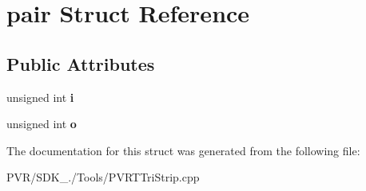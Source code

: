\hypertarget{structpair}{\section{pair Struct Reference}
\label{structpair}
}
\subsection*{Public Attributes}
\begin{DoxyCompactItemize}
\item 
\hypertarget{structpair_aa0a2b4b7917534d8cc0e88d2f950b530}{unsigned int {\bfseries i}}\label{structpair_aa0a2b4b7917534d8cc0e88d2f950b530}

\item 
\hypertarget{structpair_a8e54eebfa8fa9f8f449626524deb8d28}{unsigned int {\bfseries o}}\label{structpair_a8e54eebfa8fa9f8f449626524deb8d28}

\end{DoxyCompactItemize}


The documentation for this struct was generated from the following file\+:\begin{DoxyCompactItemize}
\item 
P\+V\+R/\+S\+D\+K\+\_./\+Tools/P\+V\+R\+T\+Tri\+Strip.\+cpp\end{DoxyCompactItemize}
